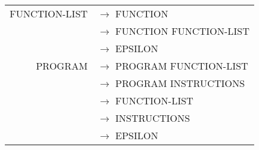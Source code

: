 \documentclass[a4paper,10pt]{article}
\begin{document}
\begin{tabular}{rl}
FUNCTION-LIST		& $\rightarrow$ FUNCTION \\
					& $\rightarrow$ FUNCTION FUNCTION-LIST\\
					& $\rightarrow$ EPSILON\\

PROGRAM				& $\rightarrow$ PROGRAM FUNCTION-LIST\\
					& $\rightarrow$ PROGRAM INSTRUCTIONS\\
					& $\rightarrow$ FUNCTION-LIST\\
					& $\rightarrow$ INSTRUCTIONS\\
					& $\rightarrow$ EPSILON\\
					
					
\end{tabular}








~\\
\end{document}
